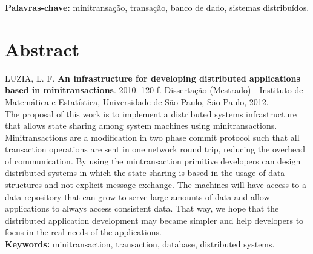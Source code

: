 \documentclass[11pt,twoside,a4paper]{book}
\begin{document}
\noindent \textbf{Palavras-chave:} minitransação, transação, banco de dado, sistemas distribuídos.

\chapter*{Abstract}
\noindent LUZIA, L. F. \textbf{An infrastructure for developing distributed applications based in minitransactions}. 
2010. 120 f.
Dissertação (Mestrado) - Instituto de Matemática e Estatística,
Universidade de São Paulo, São Paulo, 2012.
\\

The proposal of this work is to implement a distributed systems infrastructure that allows state sharing among system machines using minitransactions. Minitransactions are a modification in two phase commit protocol such that all transaction operations are sent in one network round trip, reducing the overhead of communication. By using the mintransaction primitive developers can design distributed systems in which the state sharing is based in the usage of data structures and not explicit message exchange. The machines will have access to a data repository that can grow to serve large amounts of data and allow applications to always access consistent data. That way, we hope that the distributed application development may became simpler and help developers to focus in the real needs of the applications.
\\

\noindent \textbf{Keywords:} minitransaction, transaction, database, distributed systems.

\tableofcontents

\end{document}
